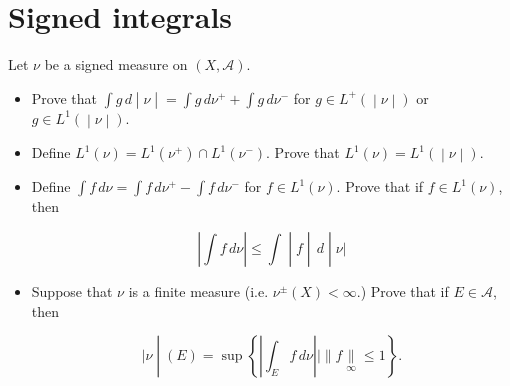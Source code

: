 \section{Signed integrals}\label{signed-integrals}

Let \(\nu\) be a signed measure on \((X,\mathcal{A})\).

\begin{itemize}
\item
  Prove that \(\left. \int g\, d \middle| \nu \middle| = \int g\, d\nu^{+} + \int g\, d\nu^{-} \right.\) for \(\left. g \in L^{+}( \middle| \nu \middle| ) \right.\) or \(\left. g \in L^{1}( \middle| \nu \middle| ) \right.\).
\item
  Define \(L^{1}(\nu) = L^{1}(\nu^{+}) \cap L^{1}(\nu^{-})\). Prove that \(\left. L^{1}(\nu) = L^{1}( \middle| \nu \middle| ) \right.\).
\item
  Define \(\int f\, d\nu = \int f\, d\nu^{+} - \int f\, d\nu^{-}\) for \(f \in L^{1}(\nu)\). Prove that if \(f \in L^{1}(\nu)\), then

  \[\left. \left| {\int f\, d\nu} \right| \leq \int \middle| f \middle| \, d \middle| \nu| \right.\]
\item
  Suppose that \(\nu\) is a finite measure (i.e. \(\nu^{\pm}(X) < \infty\).) Prove that if \(E \in \mathcal{A}\), then

  \[\left. |\nu \middle| (E) = \sup\left\{ {\left| {\int_{E}f\, d\nu} \right| \mid \parallel f\underset{\infty}{\parallel} \leq 1} \right\}. \right.\]
\end{itemize}

